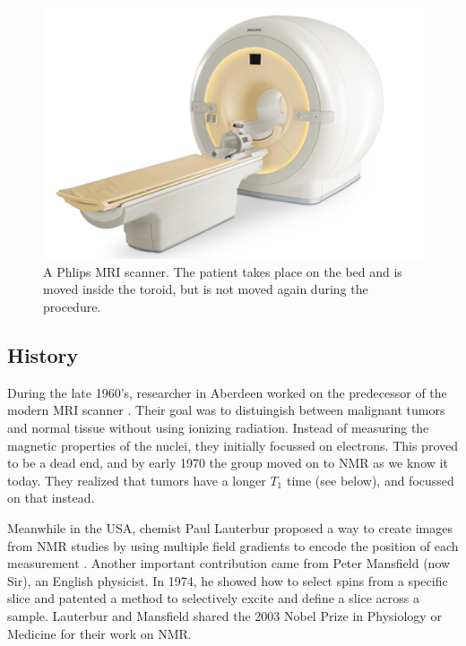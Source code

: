 \begin{figure}[ht]
\begin{center}
  \includegraphics[width=\linewidth]{img/mriscanner.jpg}
  \caption{A Phlips MRI scanner. The patient takes place on the bed and is
  moved inside the toroid, but is not moved again during the procedure.}
  \label{fig:mriscanner}
\end{center}
\end{figure}

\subsection{History}
During the late 1960's, researcher in Aberdeen worked on the predecessor of the
modern MRI scanner \cite{mrihistory}. Their goal was to distuingish between
malignant tumors and normal tissue without using ionizing radiation. Instead of
measuring the magnetic properties of the nuclei, they initially focussed on
electrons. This proved to be a dead end, and by early 1970 the group moved on to
NMR as we know it today. They realized that tumors have a longer $T_1$ time
(see below), and focussed on that instead.

Meanwhile in the USA, chemist Paul Lauterbur proposed a way to create images
from NMR studies by using multiple field gradients to encode the position of
each measurement \cite{lauterbur1973}. Another important contribution came from
Peter Mansfield (now Sir), an English physicist. In 1974, he showed how to
select spins from a specific slice and patented a method to selectively excite
and define a slice across a sample. Lauterbur and Mansfield shared the 2003
Nobel Prize in Physiology or Medicine for their work on NMR.

